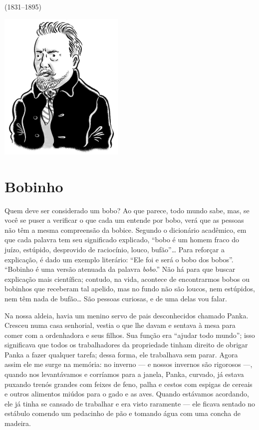 \begin{vplace}[1.5]
{\HUGES\hfill{}}

{\LARGE\hfill\textlt(1831–1895)}
\end{vplace}

\pagebreak
\thispagestyle{empty}
\mbox{}
\vfill
\begin{center}
\includegraphics[width=6cm]{./imgs/autor5.jpg}
\end{center}


\chapter{Bobinho}

Quem deve ser considerado um bobo? Ao que parece, todo mundo sabe, mas,
se você se puser a verificar o que cada um entende por bobo, verá que as
pessoas não têm a mesma compreensão da bobice. Segundo o dicionário
acadêmico, em que cada palavra tem seu significado explicado, ``bobo é
um homem fraco do juízo, estúpido, desprovido de raciocínio, louco,
bufão''\ldots{} Para reforçar a explicação, é dado um exemplo literário:
``Ele foi e será o bobo dos bobos''. ``Bobinho é uma versão atenuada da
palavra \emph{bobo}.'' Não há para que buscar explicação mais
científica; contudo, na vida, acontece de encontrarmos bobos ou bobinhos
que receberam tal apelido, mas no fundo não são loucos, nem estúpidos,
nem têm nada de bufão\ldots{} São pessoas curiosas, e de uma delas vou falar.

Na nossa aldeia, havia um menino servo de pais desconhecidos chamado
Panka. Cresceu numa casa senhorial, vestia o que lhe davam e sentava à
mesa para comer com a ordenhadora e seus filhos. Sua função era ``ajudar
todo mundo''; isso significava que todos os trabalhadores da propriedade
tinham direito de obrigar Panka a fazer qualquer tarefa; dessa forma,
ele trabalhava sem parar. Agora assim ele me surge na memória: no
inverno --- e nossos invernos são rigorosos ---, quando nos levantávamos
e corríamos para a janela, Panka, curvado, já estava puxando trenós
grandes com feixes de feno, palha e cestos com espigas de cereais e
outros alimentos miúdos para o gado e as aves. Quando estávamos
acordando, ele já tinha se cansado de trabalhar e era visto raramente
--- ele ficava sentado no estábulo comendo um pedacinho de pão e tomando
água com uma concha de madeira.

